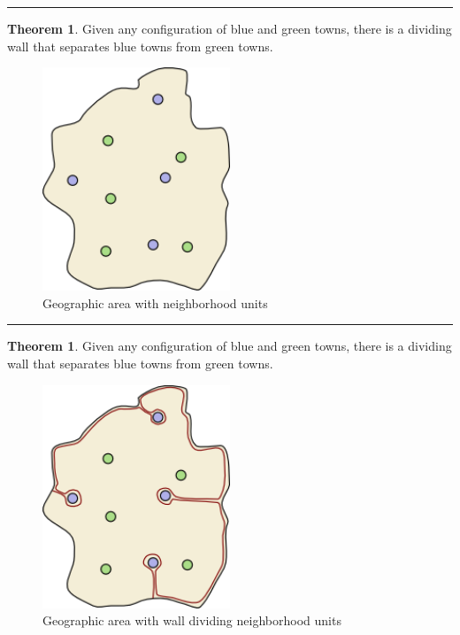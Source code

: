 \documentclass[
  letterpaper,
  DIV=11,
  numbers=noendperiod]{scrartcl}
\begin{document}
\begin{center}\rule{0.5\linewidth}{0.5pt}\end{center}

\textbf{Theorem 1}. Given any configuration of blue and green towns,
there is a dividing wall that separates blue towns from green towns.

\begin{figure}

{\centering \includegraphics[width=0.5\textwidth,height=\textheight]{wall-1.png}

}

\caption{Geographic area with neighborhood units}

\end{figure}

\begin{center}\rule{0.5\linewidth}{0.5pt}\end{center}

\textbf{Theorem 1}. Given any configuration of blue and green towns,
there is a dividing wall that separates blue towns from green towns.

\begin{figure}

{\centering \includegraphics[width=0.5\textwidth,height=\textheight]{wall-0.png}

}

\caption{Geographic area with wall dividing neighborhood units}

\end{figure}
\end{document}
